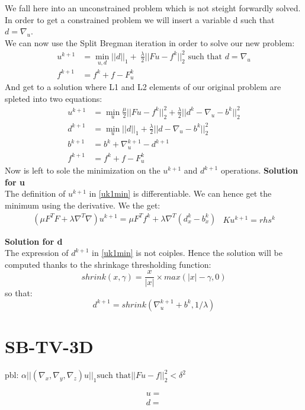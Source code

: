 	We fall here into an unconstrained problem which is not steight forwardly solved. In order to get a constrained problem we will insert a variable d such that $d = \nabla_u$.\\
	We can now use the Split Bregman iteration in order to solve our new problem: 
     \begin{equation}
        \begin{aligned}
            u^{k+1} &= \min_{u,d}||d||_1 + \ \frac{\lambda}{2}||Fu - f^k||_2^2 \mbox{ such that } d = \nabla_u\\
            f^{k+1} &= f^k + f - F_u^k
        \end{aligned}
    \end{equation}
	And get to a solution where L1 and L2 elements of our original problem are spleted into two equations:
    \begin{equation}
        \begin{aligned}
            u^{k+1} &= \min_{u} \frac{\mu}{2}||Fu - f^k||_2^2 + \frac{\lambda}{2} ||d^k - \nabla_u - b^k||_2^2\\
            d^{k+1} &= \min_{u} ||d||_1 + \frac{\lambda}{2}||d - \nabla_u-b^k||_2^2\\
            b^{k+1} &= b^k +\nabla_u^{k+1} - d^{k+1}\\
            f^{k+1} &= f^k + f - F_u^k
        \end{aligned}
        \label{uk1min}
    \end{equation}
    Now is left to sole the minimization on the $u^{k+1}$ and $d^{k+1}$ operations.
    \textbf{Solution for u}\\
     The definition of $u^{k+1}$ in \ref{uk1min} is differentiable. We can hence get the minimum using the derivative. We the get:\\

\begin{equation}
	\begin{aligned}
		(\mu F^{T}F + \lambda \nabla^{T}\nabla) u^{k+1} = \mu F^{T}f^{k} + \lambda \nabla^{T}(d^{k}_x - b^{k}_x) 
	\end{aligned}
	\begin{aligned}
		K u^{k+1} = rhs^{k} 
	\end{aligned}
\end{equation}

\textbf{Solution for d}\\
    The expression of $d^{k+1}$ in \ref{uk1min} is not coiples. Hence the solution will be computed thanks to the shrinkage thresholding function:
    \begin{equation}
    	shrink(x,\gamma) = \frac{x}{|x|}\times max(|x| - \gamma, 0)
    \end{equation}
    so that:
    \begin{equation}
    	d^{k+1} =  shrink(\nabla_u^{k+1} + b^k, 1/\lambda)
    \end{equation}
    
\section{SB-TV-3D}
    pbl: $\alpha ||(\nabla_x,\nabla_y, \nabla_z)u||_1 \mbox{such that} ||Fu - f||_2^2 < \delta^2$
    
    \begin{equation}
        \begin{aligned}
            u =\\
            d =
        \end{aligned}
    \end{equation}